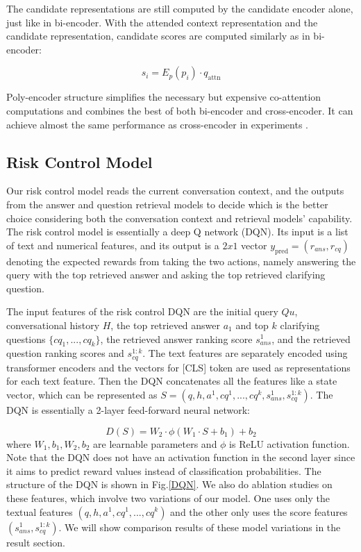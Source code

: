 \documentclass[format=acmsmall, review=False, screen=true]{acmart}
\begin{document}
The candidate representations are still computed by the candidate encoder alone, just like in bi-encoder. With the attended context representation and the candidate representation, candidate scores are computed similarly as in bi-encoder:

\begin{equation}
s_{i} = E_p(p_i)\cdot q_{\text{attn}}
\end{equation}

Poly-encoder structure simplifies the necessary but expensive co-attention computations and combines the best of both bi-encoder and cross-encoder. It can achieve almost the same performance as cross-encoder in experiments \cite{polyencoder}.

\subsection{Risk Control Model}

Our risk control model reads the current conversation context, and the outputs from the answer and question retrieval models to decide which is the better choice considering both the conversation context and retrieval models' capability. The risk control model is essentially a deep Q network (DQN). Its input is a list of text and numerical features, and its output is a $2x1$ vector $y_{\text{pred}} = (r_{ans}, r_{cq})$ denoting the expected rewards from taking the two actions, namely answering the query with the top retrieved answer and asking the top retrieved clarifying question.

The input features of the risk control DQN are the initial query $Qu$, conversational history $H$, the top retrieved answer $a_1$ and top $k$ clarifying questions $\{cq_1,...,cq_k\}$, the retrieved answer ranking score $s_{ans}^{1}$, and the retrieved question ranking scores and  $s_{cq}^{1:k}$. The text features are separately encoded using transformer encoders and the vectors for [CLS] token are used as representations for each text feature. Then the DQN concatenates all the features like a state vector, which can be represented as $S = (q, h, a^1, cq^1,..., cq^k, s_{ans}^{1}, s_{cq}^{1:k})$. The DQN is essentially a 2-layer feed-forward neural network:


\begin{equation}
D(S) = W_2\cdot \phi(W_1\cdot S + b_1) + b_2
\end{equation}
where $W_1, b_1, W_2, b_2$ are learnable parameters and $\phi$ is ReLU activation function. Note that the DQN does not have an activation function in the second layer since it aims to predict reward values instead of classification probabilities. The structure of the DQN is shown in Fig.\ref{DQN}. We also do ablation studies on these features, which involve two variations of our model. One uses only the textual features $(q, h, a^1, cq^1,..., cq^k)$ and the other only uses the score features $(s_{ans}^{1}, s_{cq}^{1:k})$. We will show comparison results of these model variations in the result section.
\end{document}
